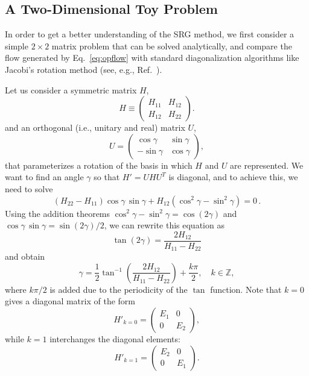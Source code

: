 {%
\subsection{\label{sec:srg_toy}A Two-Dimensional Toy Problem}

In order to get a better understanding of the SRG method, we first consider  
a simple $2\times 2$ matrix problem that can be solved analytically, and 
compare the flow generated by Eq.~\eqref{eq:opflow} with standard 
diagonalization algorithms like Jacobi's rotation method (see, e.g., 
Ref.~\cite{Golub:2013le}).

Let us consider a symmetric matrix $H$, 
\begin{equation} 
  H \equiv \begin{pmatrix} H_{11} & H_{12} \\ H_{12} & H_{22}\end{pmatrix}. 
\end{equation}
and an orthogonal (i.e., unitary and real) matrix $U$,
\begin{equation}
  U = \begin{pmatrix} \cos\gamma & \sin\gamma \\ -\sin\gamma & \cos\gamma \end{pmatrix}, 
\end{equation}
that parameterizes a rotation of the basis in which $H$ and $U$ are
represented. We want to find an angle $\gamma$ so that $H' = UHU^T$ is diagonal, 
and to achieve this, we need to solve
\begin{equation}
(H_{22} - H_{11})\cos\gamma\,\sin\gamma + H_{12}(\cos^2\gamma - \sin^2\gamma) = 0\,.
\end{equation}
Using the addition theorems $\cos^2\gamma-\sin^2\gamma = \cos(2\gamma)$ and 
$\cos\gamma\,\sin\gamma = \sin(2\gamma)/2$, we can rewrite this equation as
\begin{equation}
  \tan(2\gamma) = \frac{2 H_{12}}{H_{11}-H_{22}}
\end{equation}
and obtain
\begin{equation} 
\gamma = \frac{1}{2} \tan^{-1} \left( \frac{2H_{12}}{H_{11}-H_{22}}
\right) + \frac{k\pi}{2}, \quad k \in \mathbb{Z}, \label{eq:0} 
\end{equation}
where $k\pi/2$ is added due to the periodicity of the $\tan$ function.
Note that  $k=0$ gives a diagonal matrix of the form
\begin{equation} 
H'_{k=0} = \begin{pmatrix} E_1 & 0 \\ 0 & E_2 \end{pmatrix},
\label{eq:1} 
\end{equation}
while  $k=1$ interchanges the diagonal elements:  
\begin{equation} 
H'_{k=1} = \begin{pmatrix} E_2 & 0 \\ 0 & E_1 \end{pmatrix}.
\label{eq:2}
\end{equation}

}
